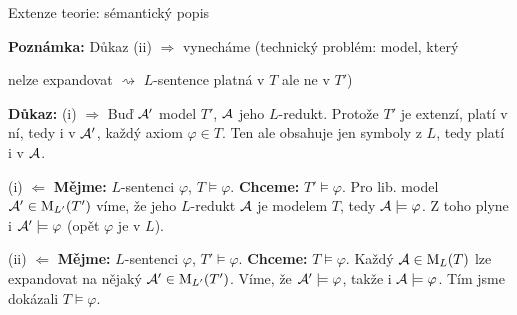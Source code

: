 \documentclass{beamer}
\begin{document}
\begin{frame}{Extenze teorie: sémantický popis}

    
    {\small \textbf{Poznámka:} Důkaz \alert{(ii) \Large $\Rightarrow$} vynecháme (technický problém: model, který

    \vspace{-11pt} nelze expandovat $\rightsquigarrow$ $L$-sentence platná v $T$ ale ne v $T'$)}\pause 

    \vspace{-3pt}
    \textbf{Důkaz:}\pause 
    \alert{(i) \Large $\Rightarrow$} Buď $\mathcal{A}'$ model $T'$, $\mathcal{A}$ jeho $L$-redukt. \pause Protože $T'$ je extenzí, platí v ní, tedy i v $\mathcal{A}'$, každý axiom $\varphi\in T$. Ten ale obsahuje jen symboly z $L$, tedy platí i v $\mathcal{A}$.
    
    \pause 
    \vspace{-3pt}
    \alert{(i) \Large $\Leftarrow$} \textbf{Mějme:} $L$-sentenci $\varphi$,  $T\models\varphi$. \textbf{Chceme:} $T'\models\varphi$. \pause Pro lib. model $\mathcal{A}'\in\operatorname{M}_{L'}(T')$ víme, že jeho $L$-redukt $\mathcal{A}$ je modelem $T$, tedy $\mathcal{A}\models\varphi$. Z toho plyne i $\mathcal{A}'\models\varphi$ (opět $\varphi$ je v $L$).
    
    \pause 
    \vspace{-3pt}
    \alert{(ii) \Large $\Leftarrow$} \textbf{Mějme:} $L$-sentenci $\varphi$,  $T'\models\varphi$. \textbf{Chceme:} $T\models\varphi$. \pause Každý $\mathcal{A}\in\operatorname{M}_L(T)$ lze expandovat na nějaký $\mathcal{A}'\in\operatorname{M}_{L'}(T')$. Víme, že $\mathcal{A}'\models\varphi$, takže i $\mathcal{A}\models\varphi$. Tím jsme dokázali $T\models\varphi$.    
    \hfill\qedsymbol
    
\end{frame}
\end{document}
